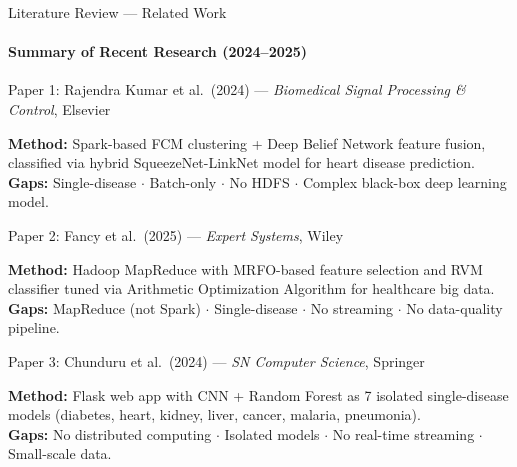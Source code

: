 \documentclass[aspectratio=169, 11pt]{beamer}
\begin{document}
\begin{frame}{Literature Review --- Related Work}
\framesubtitle{Summary of Recent Research (2024--2025)}

\vspace{0.1cm}
{\small

\begin{block}{\small Paper 1: Rajendra Kumar et al.\ (2024) --- \textit{Biomedical Signal Processing \& Control}, Elsevier}
\end{block}
\vspace{-0.15cm}
\textbf{Method:} Spark-based FCM clustering + Deep Belief Network feature fusion, classified via hybrid SqueezeNet-LinkNet model for heart disease prediction.\\
\textcolor{msRed}{\textbf{Gaps:}} Single-disease $\cdot$ Batch-only $\cdot$ No HDFS $\cdot$ Complex black-box deep learning model.

\vspace{0.25cm}

\begin{block}{\small Paper 2: Fancy et al.\ (2025) --- \textit{Expert Systems}, Wiley}
\end{block}
\vspace{-0.15cm}
\textbf{Method:} Hadoop MapReduce with MRFO-based feature selection and RVM classifier tuned via Arithmetic Optimization Algorithm for healthcare big data.\\
\textcolor{msRed}{\textbf{Gaps:}} MapReduce (not Spark) $\cdot$ Single-disease $\cdot$ No streaming $\cdot$ No data-quality pipeline.

\vspace{0.25cm}

\begin{block}{\small Paper 3: Chunduru et al.\ (2024) --- \textit{SN Computer Science}, Springer}
\end{block}
\vspace{-0.15cm}
\textbf{Method:} Flask web app with CNN + Random Forest as 7 isolated single-disease models (diabetes, heart, kidney, liver, cancer, malaria, pneumonia).\\
\textcolor{msRed}{\textbf{Gaps:}} No distributed computing $\cdot$ Isolated models $\cdot$ No real-time streaming $\cdot$ Small-scale data.

}
\end{frame}
\end{document}
